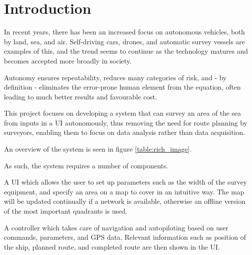 \newpage
\chapter{Introduction}
In recent years, there has been an increased focus on autonomous vehicles, both by land, sea, and air. Self-driving cars, drones, and automatic survey vessels are examples of this, and the trend seems to continue as the technology matures and becomes accepted more broadly in society.

Autonomy ensures repeatability, reduces many categories of risk, and - by definition - eliminates the error-prone human element from the equation, often leading to much better results and favourable cost. 

This project focuses on developing a system that can survey an area of the sea from inputs in a UI autonomously, thus removing the need for route planning by surveyors, enabling them to focus on data analysis rather than data acquisition. 

An overview of the system is seen in figure \ref{table:rich_image}.

As such, the system requires a number of components. 

A UI which allows the user to set up parameters such as the width of the survey equipment, and specify an area on a map to cover in an intuitive way. The map will be updated continually if a network is available, otherwise an offline version of the most important quadrants is used.

A controller which takes care of navigation and autopiloting based on user commands, parameters, and GPS data. Relevant information such as position of the ship, planned route, and completed route are then shown in the UI.


